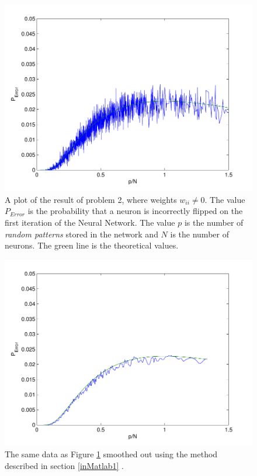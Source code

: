 \documentclass[12pt,a4paper]{article}
\begin{document}
\begin{figure}\centering
\includegraphics[width=12cm]{uppg2.pdf}
\caption{\label{uppg2} A plot of the result of problem 2, where weights
$w_{ii} \neq 0$. The value $P_{Error}$ is the probability that a neuron is
incorrectly flipped on the first iteration of the Neural Network.  The value
$p$ is the number of \emph{random patterns} stored in the network and $N$ is
the number of neurons. The green line is the theoretical values.}
\end{figure}

\begin{figure}\centering
\includegraphics[width=12cm]{uppg2_smooth.pdf}
\caption{\label{uppg2_smooth} The same data as Figure \ref{uppg2} smoothed out using the method described in section \ref{inMatlab1} .}
\end{figure}
\end{document}

